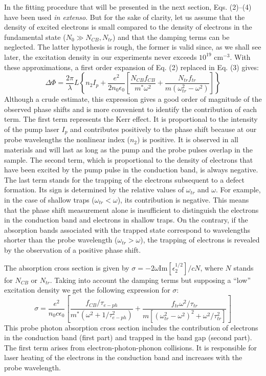 \documentclass[aps,prb,reprint]{revtex4-2}
\begin{document}
In the fitting procedure that will be presented in the next section, Eqs. (2)--(4) have been used \textit{in extenso}. But for the sake of clarity, let us assume that the density of excited electrons is small compared to the density of electrons in the fundamental state ($N_0 \gg N_{CB}, N_{tr}$) and that the damping terms can be neglected. The latter hypothesis is rough, the former is valid since, as we shall see later, the excitation density in our experiments never exceeds $10^{19}$ cm$^{-3}$. With these approximations, a first order expansion of Eq. (2) replaced in Eq. (3) gives:
\begin{equation}
\Delta \Phi = \frac{2\pi}{\lambda} L \left\{ n_2 I_p + \frac{e^2}{2 n_0 \epsilon_0} \left[ \frac{N_{CB} f_{CB}}{m^* \omega^2} + \frac{N_{tr} f_{tr}}{m (\omega_{tr}^2 - \omega^2)} \right] \right\}
\end{equation}
Although a crude estimate, this expression gives a good order of magnitude of the observed phase shifts\cite{5,6} and is more convenient to identify the contribution of each term. The first term represents the Kerr effect. It is proportional to the intensity of the pump laser $I_p$ and contributes positively to the phase shift because at our probe wavelengths the nonlinear index ($n_2$) is positive. It is observed in all materials and will last as long as the pump and the probe pulses overlap in the sample. The second term, which is proportional to the density of electrons that have been excited by the pump pulse in the conduction band, is always negative. The last term stands for the trapping of the electrons subsequent to a defect formation. Its sign is determined by the relative values of $\omega_{tr}$ and $\omega$. For example, in the case of shallow traps ($\omega_{tr} < \omega$), its contribution is negative. This means that the phase shift measurement alone is insufficient to distinguish the electrons in the conduction band and electrons in shallow traps. On the contrary, if the absorption bands associated with the trapped state correspond to wavelengths shorter than the probe wavelength ($\omega_{tr} > \omega$), the trapping of electrons is revealed by the observation of a positive phase shift.

The absorption cross section is given by $\sigma = -2\omega \text{Im}[\epsilon_2^{1/2}]/cN$, where $N$ stands for $N_{CB}$ or $N_{tr}$. Taking into account the damping terms but supposing a ``low'' excitation density we get the following expression for $\sigma$:
\begin{equation}
\sigma = \frac{e^2}{n_0 c \epsilon_0} \left[ \frac{f_{CB}/\tau_{e-ph}}{m^* (\omega^2 + 1/\tau_{e-ph}^2)} + \frac{f_{tr} \omega^2/\tau_{tr}}{m [(\omega_{tr}^2 - \omega^2)^2 + \omega^2/\tau_{tr}^2]} \right]
\end{equation}
This probe photon absorption cross section includes the contribution of electrons in the conduction band (first part) and trapped in the band gap (second part). The first term arises from electron-photon-phonon collisions. It is responsible for laser heating of the electrons in the conduction band\cite{18,19} and increases with the probe wavelength.
\end{document}
